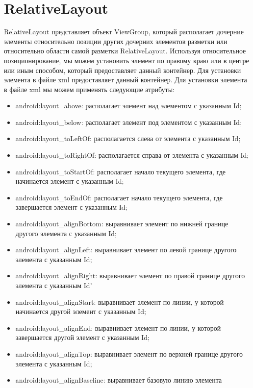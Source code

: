 \section{RelativeLayout}
RelativeLayout представляет объект ViewGroup, который располагает
дочерние элементы относительно позиции других дочерних элементов
разметки или относительно области самой разметки RelativeLayout.
Используя относительное позиционирование, мы можем установить элемент
по правому краю или в центре или иным способом, который предоставляет
данный контейнер.
Для установки элемента в файле xml предоставляет
данный контейнер.
Для установки элемента в файле xml мы можем
применять следующие атрибуты:
\begin{itemize}
    \item android:layout\_above: располагает элемент над элементом с
    указанным Id;
    \item android:layout\_below: располагает элемент под элементом с
    указанным Id;
    \item android:layout\_toLeftOf: располагается слева от элемента с
    указанным Id;
    \item android:layout\_toRightOf: располагается справа от элемента с
    указанным Id;
    \item android:layout\_toStartOf: располагает начало текущего элемента, где
    начинается элемент с указанным Id;
    \item android:layout\_toEndOf: располагает начало текущего элемента, где
    завершается элемент с указанным Id;
    \item android:layout\_alignBottom: выравнивает элемент по нижней
    границе другого элемента с указанным Id;
    \item android:layout\_alignLeft: выравнивает элемент по левой границе
    другого элемента с указанным Id;
    \item android:layout\_alignRight: выравнивает элемент по правой границе
    другого элемента с указанным Id'
    \item android:layout\_alignStart: выравнивает элемент по линии, у которой
    начинается другой элемент с указанным Id;
    \item android:layout\_alignEnd: выравнивает элемент по линии, у которой
    завершается другой элемент с указанным Id;
    \item android:layout\_alignTop: выравнивает элемент по верхней границе
    другого элемента с указанным Id;
    \item android:layout\_alignBaseline: выравнивает базовую линию элемента

\end{itemize}
